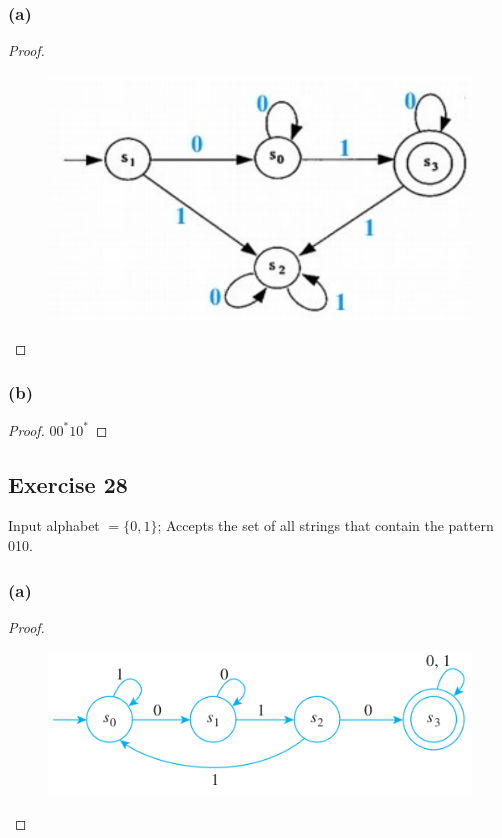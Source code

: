 \documentclass[14pt]{extarticle}
\begin{document}
\subsubsection{(a)}
\begin{proof}
\begin{figure}[ht!]
\centering
\includegraphics[scale=0.4]{../images/12.2.27.a.png}
\end{figure}
\end{proof}

\subsubsection{(b)}
\begin{proof}
\(00^*10^*\)
\end{proof}

\subsection{Exercise 28}
Input alphabet \(= \{0, 1\}\); Accepts the set of all strings that contain the pattern 010.

\subsubsection{(a)}
\begin{proof}
\begin{figure}[ht!]
\centering
\includegraphics[scale=0.5]{../images/12.2.28.a.png}
\end{figure}
\end{proof}
\end{document}
